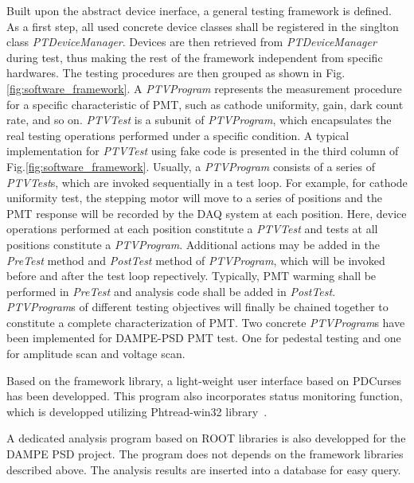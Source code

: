 \documentclass[5p, times]{elsarticle}
\begin{document}
Built upon the abstract device inerface, a general testing framework is defined.
As a first step, all used concrete device classes shall be registered in the singlton class \textit{PTDeviceManager}.
Devices are then retrieved from \textit{PTDeviceManager} during test, thus making the rest of the framework independent from specific hardwares.
The testing procedures are then grouped as shown in Fig.\ref{fig:software_framework}.
A \textit{PTVProgram} represents the measurement procedure for a specific characteristic of PMT, such as cathode uniformity, gain, dark count rate, and so on.
\textit{PTVTest} is a subunit of \textit{PTVProgram}, which encapsulates the real testing operations performed under a specific condition.
A typical implementation for \textit{PTVTest} using fake code is presented in the third column of Fig.\ref{fig:software_framework}.
Usually, a \textit{PTVProgram} consists of a series of \textit{PTVTest}s, which are invoked sequentially in a test loop.
For example, for cathode uniformity test, the stepping motor will move to a series of positions and the PMT response will be recorded by the DAQ system at each position.
Here, device operations performed at each position constitute a \textit{PTVTest} and tests at all positions constitute a \textit{PTVProgram}.
Additional actions may be added in the \textit{PreTest} method and \textit{PostTest} method of \textit{PTVProgram}, which will be invoked before and after the test loop repectively.
Typically, PMT warming shall be performed in \textit{PreTest} and analysis code shall be added in \textit{PostTest}.
\textit{PTVProgram}s of different testing objectives will finally be chained together to constitute a complete characterization of PMT.
Two concrete \textit{PTVProgram}s have been implemented for DAMPE-PSD PMT test.
One for pedestal testing and one for amplitude scan and voltage scan.

Based on the framework library, a light-weight user interface based on PDCurses~\cite{pdcurses} has been developped.
This program also incorporates status monitoring function, which is developped utilizing Phtread-win32 library~\cite{pthread_win32}.

A dedicated analysis program based on ROOT libraries is also developped for the DAMPE PSD project.
The program does not depends on the framework libraries described above.
The analysis results are inserted into a database for easy query.
\end{document}

